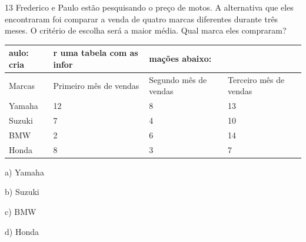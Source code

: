 

\num{13} Frederico e Paulo estão pesquisando o preço de motos. A alternativa
que eles encontraram foi comparar a venda de quatro marcas diferentes
durante três meses. O critério de escolha será a maior média. Qual marca
eles compraram?

\begin{longtable}[]{@{}llll@{}}
\toprule
aulo: cria & r uma tabela com as infor & mações abaixo: &\tabularnewline
\midrule
\endhead
Marcas~ & Primeiro mês de vendas & Segundo mês de vendas & Terceiro mês
de vendas\tabularnewline
Yamaha & 12 & 8 & 13\tabularnewline
Suzuki & 7 & 4 & 10\tabularnewline
BMW & 2 & 6 & 14\tabularnewline
Honda & 8 & 3 & 7\tabularnewline
\bottomrule
\end{longtable}

a) Yamaha

b) Suzuki

c) BMW

d) Honda





